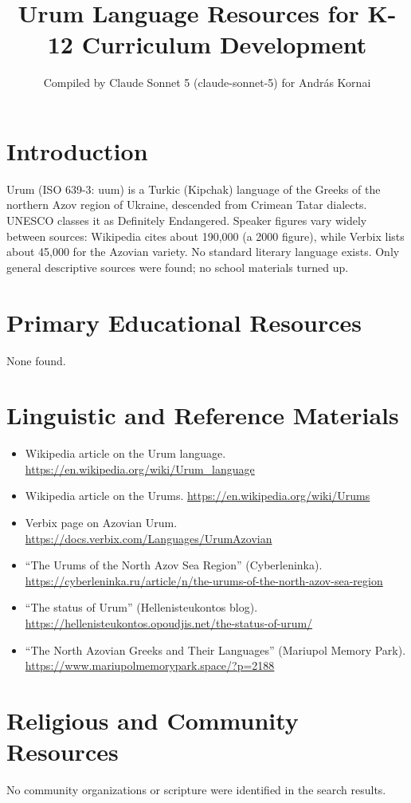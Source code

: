 \documentclass[12pt]{article}
\title{Urum Language Resources for K-12 Curriculum Development}
\author{Compiled by Claude Sonnet 5 (claude-sonnet-5) for Andr\'as Kornai}
\date{}
\begin{document}
\maketitle

\section{Introduction}
Urum (ISO 639-3: uum) is a Turkic (Kipchak) language of the Greeks of the northern Azov region of Ukraine, descended from Crimean Tatar dialects. UNESCO classes it as Definitely Endangered. Speaker figures vary widely between sources: Wikipedia cites about 190,000 (a 2000 figure), while Verbix lists about 45,000 for the Azovian variety. No standard literary language exists. Only general descriptive sources were found; no school materials turned up.

\section{Primary Educational Resources}
None found.

\section{Linguistic and Reference Materials}
\begin{itemize}
\item Wikipedia article on the Urum language. \url{https://en.wikipedia.org/wiki/Urum_language}
\item Wikipedia article on the Urums. \url{https://en.wikipedia.org/wiki/Urums}
\item Verbix page on Azovian Urum. \url{https://docs.verbix.com/Languages/UrumAzovian}
\item ``The Urums of the North Azov Sea Region'' (Cyberleninka). \url{https://cyberleninka.ru/article/n/the-urums-of-the-north-azov-sea-region}
\item ``The status of Urum'' (Hellenisteukontos blog). \url{https://hellenisteukontos.opoudjis.net/the-status-of-urum/}
\item ``The North Azovian Greeks and Their Languages'' (Mariupol Memory Park). \url{https://www.mariupolmemorypark.space/?p=2188}
\end{itemize}

\section{Religious and Community Resources}
No community organizations or scripture were identified in the search results.
\end{document}
